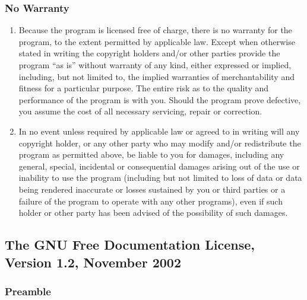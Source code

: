 \subsubsection{No Warranty}

\begin{enumerate}
\addtocounter{enumi}{9}
\item
  Because the program is licensed free of charge, there is no warranty for the program, to the extent permitted by applicable law. Except when otherwise stated in writing the copyright holders and/or other parties provide the program ``as is'' without warranty of any kind, either expressed or implied, including, but not limited to, the implied warranties of merchantability and fitness for a particular purpose. The entire risk as to the quality and performance of the program is with you. Should the program prove defective, you assume the cost of all necessary servicing, repair or correction.
\item
  In no event unless required by applicable law or agreed to in writing will any copyright holder, or any other party who may modify and/or redistribute the program as permitted above, be liable to you for damages, including any general, special, incidental or consequential damages arising out of the use or inability to use the program (including but not limited to loss of data or data being rendered inaccurate or losses sustained by you or third parties or a failure of the program to operate with any other programs), even if such holder or other party has been advised of the possibility of such damages.
\end{enumerate}


\subsection{The GNU Free Documentation License, Version 1.2, November 2002}
\label{label_fdl}


\subsubsection{Preamble}

